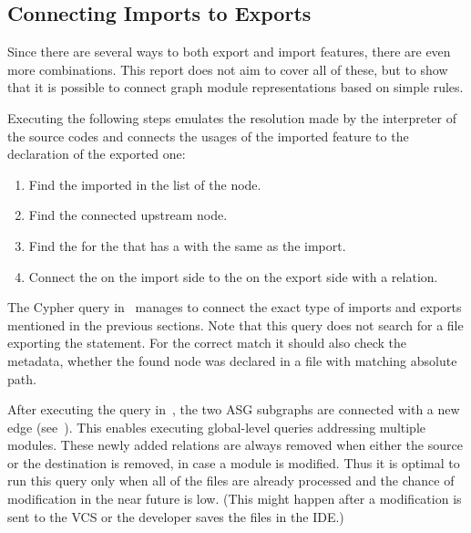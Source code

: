 \subsection{Connecting Imports to Exports}
Since there are several ways to both export and import features, there are even more combinations. This report does not aim to cover all of these, but to show that it is possible to connect graph module representations based on simple rules.

Executing the following steps emulates the resolution made by the interpreter of the source codes and connects the usages of the imported feature to the declaration of the exported one:

\begin{enumerate}[topsep=0pt]
	\item Find the imported  in the  list of the  node.
	\item Find the connected upstream  node.
	\item Find the  for the  that has a  with the same  as the import.
	\item Connect the  on the import side to the  on the export side with a  relation.
\end{enumerate}

The Cypher query in~ manages to connect the exact type of imports and exports mentioned in the previous sections. Note that this query does not search for a file exporting the statement. For the correct match it should also check the metadata, whether the found node was declared in a file with matching absolute path.

\begin{figure}[!htb]
	\begin{minipage}{\textwidth}
		
	\end{minipage}
\end{figure}

After executing the query in~, the two ASG subgraphs are connected with a new edge (see~). This enables executing global-level queries addressing multiple modules. These newly added relations are always removed when either the source or the destination is removed, in case a module is modified. Thus it is optimal to run this query only when all of the files are already processed and the chance of modification in the near future is low. (This might happen after a modification is sent to the VCS or the developer saves the files in the IDE.)

